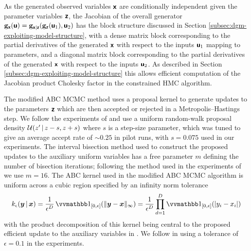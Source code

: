 As the generated observed variables $\boldsymbol{\mathsf{x}}$ are conditionally independent given the parameter variables $\boldsymbol{\mathsf{z}}$, the Jacobian of the overall generator ${\mathbf{g}}_{\boldsymbol{\mathsf{x}}}(\boldsymbol{\mathsf{u}}) = {\mathbf{g}}_{\boldsymbol{\mathsf{x}}|\boldsymbol{\mathsf{z}}}({\mathbf{g}}_{\boldsymbol{\mathsf{z}}}(\boldsymbol{\mathsf{u}}_1),\boldsymbol{\mathsf{u}}_2)$ has the block structure discussed in Section \ref{subsec:dgm-exploiting-model-structure}, with a dense matrix block corresponding to the partial derivatives of the generated $\boldsymbol{\mathsf{x}}$ with respect to the inputs $\boldsymbol{\mathsf{u}}_1$ mapping to parameters, and a diagonal matrix block corresponding to the partial derivatives of the generated $\boldsymbol{\mathsf{x}}$ with respect to the inputs $\boldsymbol{\mathsf{u}}_2$. As described in Section \ref{subsec:dgm-exploiting-model-structure} this allows efficient computation of the Jacobian product Cholesky factor in the constrained \ac{HMC} algorithm.

The modified \ac{ABC} \ac{MCMC} method uses a proposal kernel to generate updates to the parameters $\boldsymbol{\mathsf{z}}$ which are then accepted or rejected in a Metropolis--Hastings step. We follow the experiments of \citep{mcvinish2012improving} and use a uniform random-walk proposal density $\mathcal{U}(z' \operatorname{|} z - s, z +s)$ where $s$ is a step-size parameter, which was tuned to give an average accept rate of $\sim 0.25$ in pilot runs, with $s = 0.075$ used in our experiments. The interval bisection method used to construct the proposed updates to the auxiliary uniform variables has a free parameter $m$ defining the number of bisection iterations; following the method used in the experiments of \citep{mcvinish2012improving} we use $m = 16$. The \ac{ABC} kernel used in the modified \ac{ABC} \ac{MCMC} algorithm is uniform across a cubic region specified by an infinity norm tolerance
\begin{equation}
  k_{\epsilon}(\vct{y} \gvn \vct{x}) = \frac{1}{\epsilon^D} \ind{[0,\epsilon]}\lpa \Vert \vct{y} - \vct{x} \Vert_{\infty}\rpa = \frac{1}{\epsilon^D} \prod_{d=1}^D \ind{[0,\epsilon]}(|y_i - x_i|)
\end{equation}
with the product decomposition of this kernel being central to the proposed efficient update to the auxiliary variables in \citep{mcvinish2012improving}. We follow \citep{mcvinish2012improving} in using a tolerance of $\epsilon = 0.1$ in the experiments.

